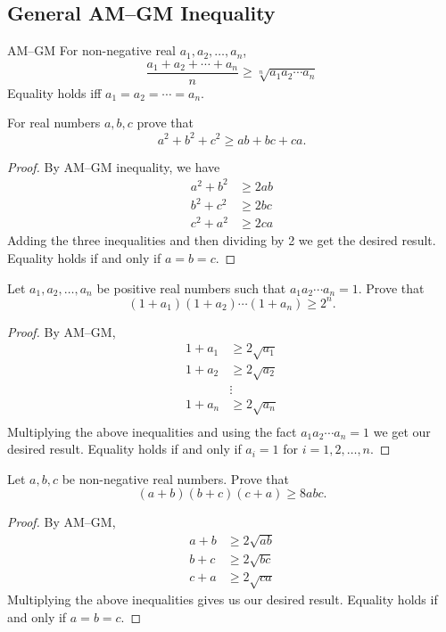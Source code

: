 \subsection{General AM--GM Inequality}
\begin{thrm}{AM--GM}{}
For non-negative real $a_1, a_2, \dots , a_n$, 
\begin{equation} \frac{a_1 + a_2 + \cdots + a_n}{n} \ge \sqrt[n]{a_1 a_2 \cdots a_n} \end{equation} 
Equality holds iff $a_1 = a_2 = \cdots = a_n$. 
\end{thrm}

\begin{exmp}{}{}
For real numbers $a, b, c$ prove that
\[ a^2+b^2+c^2 \ge ab+bc+ca. \]
\end{exmp}
\begin{proof}
By AM--GM inequality, we have
\begin{align*}
a^2 + b^2 &\ge 2ab \\
b^2 + c^2 &\ge 2bc \\
c^2 + a^2 &\ge 2ca
\end{align*}
Adding the three inequalities and then dividing by 2 we get the desired result. Equality holds if and only if $a=b=c$.
\end{proof}

\begin{exmp}{}{}
Let $a_1,a_2,\dots,a_n$ be positive real numbers such that $a_1a_2\cdots a_n=1$. Prove that
\[ (1+a_1)(1+a_2)\cdots(1+a_n) \ge 2^n. \]
\end{exmp}
\begin{proof}
By AM--GM,
\begin{align*}
1 + a_1 &\ge 2\sqrt{a_1} \\
1 + a_2 &\ge 2\sqrt{a_2} \\
&\vdots \\
1 + a_n &\ge 2\sqrt{a_n} \\
\end{align*}
Multiplying the above inequalities and using the fact $a_1a_2\cdots a_n=1$ we get our desired result. Equality holds if and only if $a_i=1$ for $i=1,2,\dots,n$.
\end{proof}

\begin{exmp}{}{}
Let $a, b, c$ be non-negative real numbers. Prove that
\[ (a+b)(b+c)(c+a) \ge 8abc. \]
\end{exmp}
\begin{proof}
By AM--GM,
\begin{align*}
a+b &\ge 2\sqrt{ab} \\
b+c &\ge 2\sqrt{bc} \\
c+a &\ge 2\sqrt{ca}
\end{align*}
Multiplying the above inequalities gives us our desired result. Equality holds if and only if $a=b=c$.
\end{proof}

